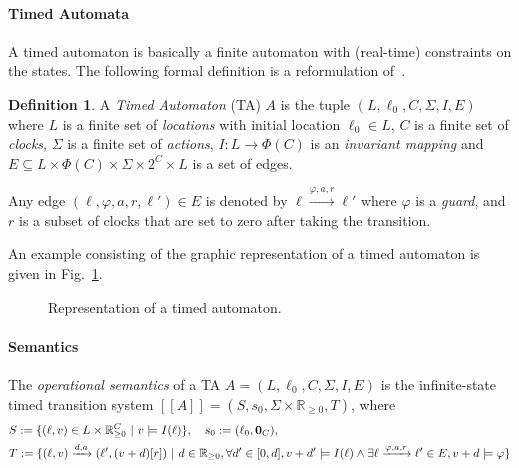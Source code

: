 \documentclass[11pt]{article}
\theoremstyle{definition}
\newtheorem{definition}{Definition}
\theoremstyle{remark}
\theoremstyle{definition}
\begin{document}

\paragraph{Timed Automata}\label{par:ta}
A timed automaton is basically a finite automaton with (real-time) constraints on the states.
The following formal definition is a reformulation of~\cite[Chapter 29.2, Definition 1]{handbook}.
\begin{definition}\label{def:ta}
	A \emph{Timed Automaton} (TA) $A$ is the tuple $(L, \ell_0, C, \Sigma, I, E)$ where
	$L$ is a finite set of \emph{locations} with initial location $\ell_0 \in L$,
	$C$ is a finite set of \emph{clocks},
	$\Sigma$ is a finite set of \emph{actions},
	$I \colon L \to \Phi(C)$ is an \emph{invariant mapping} and
	$E \subseteq L \times \Phi(C) \times \Sigma \times 2^{C} \times L$ is a set of edges.

	Any edge $(\ell, \varphi, a, r, \ell') \in E$ is denoted by $\ell \xrightarrow{\varphi, a, r} \ell'$ where $\varphi$ is a \emph{guard}, and $r$ is a subset of clocks that are set to zero after taking the transition.
\end{definition}
An example consisting of the graphic representation of a timed automaton is given in Fig.~\ref{fig:ta_ex}.

\begin{figure}[ht]
\centering
{}
\caption{Representation of a timed automaton.}\label{fig:ta_ex}
\end{figure}

\paragraph{Semantics}\label{par:semantics}
The \emph{operational semantics} of a TA $A = (L, \ell_0, C, \Sigma, I, E)$ is the infinite-state timed transition system $[\![A]\!] = (S, s_0, \Sigma \times \mathbb{R}_{\geq 0}, T)$, where
\begin{align*}
	&S := \{(\ell, v) \in L \times \mathbb{R}_{\geq 0}^C\ |\ v \models I(\ell)\}, \quad s_0 := (\ell_0, \text{\bf 0}_C),\\
	&T := \{(\ell, v) \xrightarrow{d, a} (\ell', (v+d)[r]) \ | \ d \in \mathbb{R}_{\geq 0}, \forall d' \in [0, d], v + d' \models I(\ell) \land \exists \ell \xrightarrow{\varphi, a, r} \ell' \in E, v + d \models \varphi \}
\end{align*}
\end{document}

